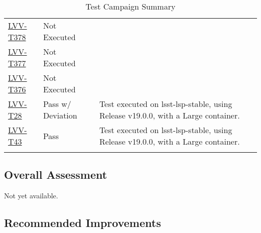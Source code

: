 \documentclass[DM,lsstdraft,STR,toc]{lsstdoc}
\begin{document}
\begin{longtable}{p{2cm}p{2.5cm}p{9cm}p{2.5cm}}
\begin{minipage}[]{9cm}
    \medskip
    \end{minipage}
    &
    \\\hline
\href{https://jira.lsstcorp.org/secure/Tests.jspa#/testCase/LVV-T378}{LVV-T378}
    & Not Executed &
    \begin{minipage}[]{9cm}
    \smallskip
    
    \medskip
    \end{minipage}
    &
    \\\hline
\href{https://jira.lsstcorp.org/secure/Tests.jspa#/testCase/LVV-T377}{LVV-T377}
    & Not Executed &
    \begin{minipage}[]{9cm}
    \smallskip
    
    \medskip
    \end{minipage}
    &
    \\\hline
\href{https://jira.lsstcorp.org/secure/Tests.jspa#/testCase/LVV-T376}{LVV-T376}
    & Not Executed &
    \begin{minipage}[]{9cm}
    \smallskip
    
    \medskip
    \end{minipage}
    &
    \\\hline
\href{https://jira.lsstcorp.org/secure/Tests.jspa#/testCase/LVV-T28}{LVV-T28}
    & Pass w/ Deviation &
    \begin{minipage}[]{9cm}
    \smallskip
     Test executed on lsst-lsp-stable, using Release v19.0.0, with a Large
container.

    \medskip
    \end{minipage}
    &
    \\\hline
\href{https://jira.lsstcorp.org/secure/Tests.jspa#/testCase/LVV-T43}{LVV-T43}
    & Pass &
    \begin{minipage}[]{9cm}
    \smallskip
     Test executed on lsst-lsp-stable, using Release v19.0.0, with a Large
container.

    \medskip
    \end{minipage}
    &
    \\\hline
\caption{Test Campaign Summary}
\label{table:summary}
\end{longtable}

\subsection{Overall Assessment}
\label{sect:overallassessment}

Not yet available.

\subsection{Recommended Improvements}
\label{sect:recommendations}
\end{document}
